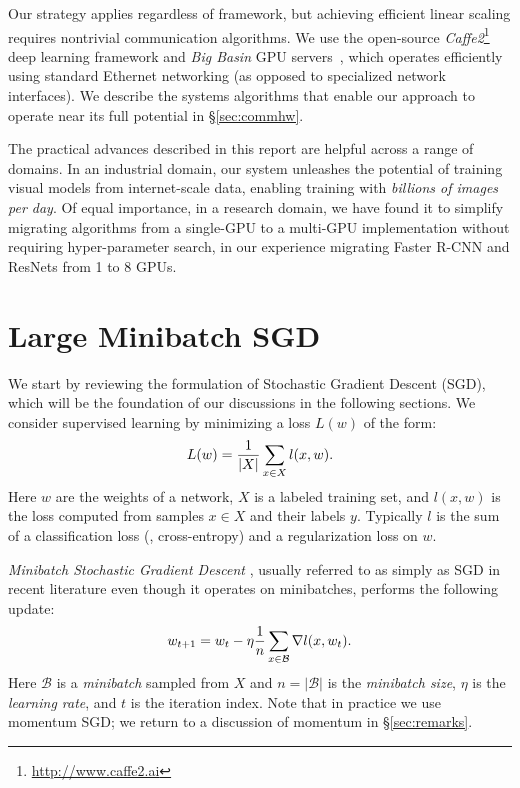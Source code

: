 \documentclass[10pt,twocolumn,letterpaper]{article}
\def\B{\mathcal{B}}
\newcommand{\eqntight}[2]{\vspace{-1mm}\begin{equation}\label{eq:#1}#2\vspace{-1mm}\end{equation}\ignorespaces}
\begin{document}
Our strategy applies regardless of framework, but achieving efficient linear scaling requires nontrivial communication algorithms. We use the open-source \emph{Caffe2}\footnote{\url{http://www.caffe2.ai}} deep learning framework and \emph{Big Basin} GPU servers~\cite{Lee2017}, which operates efficiently using standard Ethernet networking (as opposed to specialized network interfaces). We describe the systems algorithms that enable our approach to operate near its full potential in \S\ref{sec:commhw}.

The practical advances described in this report are helpful across a range of domains. In an industrial domain, our system unleashes the potential of training visual models from internet-scale data, enabling training with \emph{billions of images per day}. Of equal importance, in a research domain, we have found it to simplify migrating algorithms from a single-GPU to a multi-GPU implementation without requiring hyper-parameter search, \eg in our experience migrating Faster R-CNN \cite{Ren2015} and ResNets \cite{He2016} from 1 to 8 GPUs.

\section{Large Minibatch SGD}\label{sec:sgd}

We start by reviewing the formulation of Stochastic Gradient Descent (SGD), which will be the foundation of our discussions in the following sections. We consider supervised learning by minimizing a loss $L(w)$ of the form:
 \eqntight{loss}{ L(w) = \frac{1}{|X|}\sum_{x\in X} l(x,w). }
Here $w$ are the weights of a network, $X$ is a labeled training set, and $l(x,w)$ is the loss computed from samples $x\in X$ and their labels $y$. Typically $l$ is the sum of a classification loss (\eg, cross-entropy) and a regularization loss on $w$.

\emph{Minibatch Stochastic Gradient Descent} \cite{Robbins1951}, usually referred to as simply as SGD in recent literature even though it operates on minibatches, performs the following update:
 \eqntight{sgd}{ w_{t+1} = w_{t} - \eta \frac{1}{n}\sum_{x\in\B} \nabla l(x,w_t). }
Here $\B$ is a \emph{minibatch} sampled from $X$ and $n=|\B|$ is the \emph{minibatch size}, $\eta$ is the \emph{learning rate}, and $t$ is the iteration index. Note that in practice we use momentum SGD; we return to a discussion of momentum in \S\ref{sec:remarks}.
\end{document}
